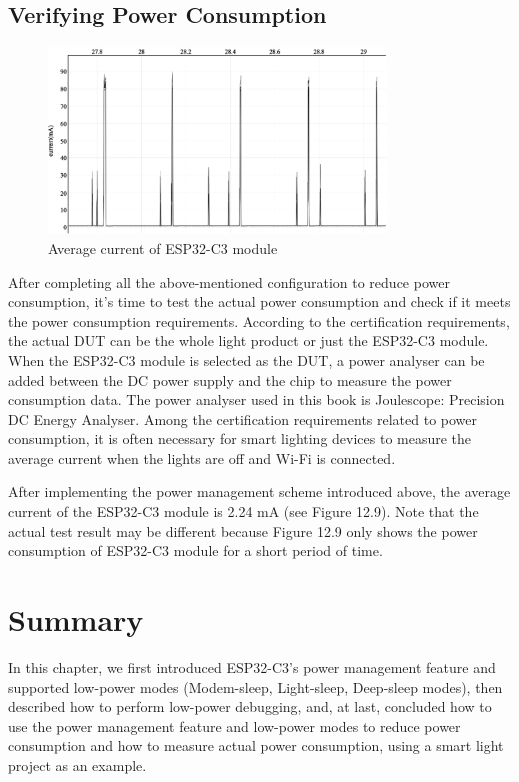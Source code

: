 \documentclass[a4paper,12pt,openany]{book}
\begin{document}
\subsection{Verifying Power Consumption}
\begin{figure}[!h]
    \centering
    \includegraphics[width=0.8\textwidth]{D12Z/12-9}
    \caption{Average current of ESP32-C3 module}
\end{figure}
After completing all the above-mentioned configuration to reduce power consumption, it’s time to test the actual power consumption and check if it meets the power consumption requirements. According to the certification requirements, the actual DUT can be the whole light product or just the ESP32-C3 module. When the ESP32-C3 module is selected as the DUT, a power analyser can be added between the DC power supply and the chip to measure the power consumption data. The power analyser used in this book is Joulescope: Precision DC Energy Analyser. Among the certification requirements related to power consumption, it is often necessary for smart lighting devices to measure the average current when the lights are off and Wi-Fi is connected.

After implementing the power management scheme introduced above, the average current of the ESP32-C3 module is 2.24 mA (see Figure 12.9). Note that the actual test result may be different because Figure 12.9 only shows the power consumption of ESP32-C3 module for a short period of time.

\section{Summary}
In this chapter, we first introduced ESP32-C3’s power management feature and supported low-power modes (Modem-sleep, Light-sleep, Deep-sleep modes), then described how to perform low-power debugging, and, at last, concluded how to use the power management feature and low-power modes to reduce power consumption and how to measure actual power consumption, using a smart light project as an example.
\end{document}
